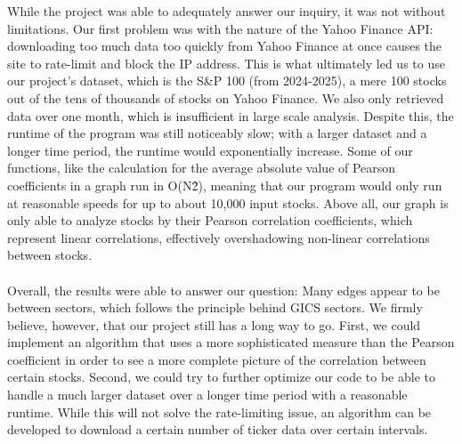 \documentclass[fontsize=11pt]{article}
\begin{document}
While the project was able to adequately answer our inquiry, it was not without limitations. Our first problem was with the nature of the Yahoo Finance API: downloading too much data too quickly from Yahoo Finance at once causes the site to rate-limit and block the IP address. This is what ultimately led us to use our project’s dataset, which is the S\&P 100 (from 2024-2025), a mere 100 stocks out of the tens of thousands of stocks on Yahoo Finance. We also only retrieved data over one month, which is insufficient in large scale analysis. Despite this, the runtime of the program was still noticeably slow; with a larger dataset and a longer time period, the runtime would exponentially increase. Some of our functions, like the calculation for the average absolute value of Pearson coefficients in a graph run in O(N\^2), meaning that our program would only run at reasonable speeds for up to about 10,000 input stocks. Above all, our graph is only able to analyze stocks by their Pearson correlation coefficients, which represent linear correlations, effectively overshadowing non-linear correlations between stocks. \\\\

Overall, the results were able to answer our question: Many edges appear to be between sectors, which follows the principle behind GICS sectors. We firmly believe, however, that our project still has a long way to go. First, we could implement an algorithm that uses a more sophisticated measure than the Pearson coefficient in order to see a more complete picture of the correlation between certain stocks. Second, we could try to further optimize our code to be able to handle a much larger dataset over a longer time period with a reasonable runtime. While this will not solve the rate-limiting issue, an algorithm can be developed to download a certain number of ticker data over certain intervals.
\end{document}
